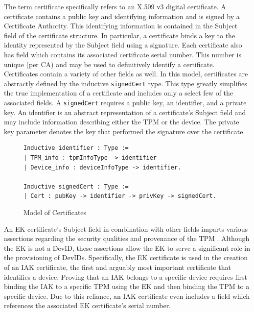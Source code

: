 The term certificate specifically refers to an X.509 v3 digital certificate. 
A certificate contains a public key and identifying information and is signed by a Certificate Authority. This identifying information is contained in the Subject field of the certificate structure. 
In particular, a certificate binds a key to the identity represented by the Subject field using a signature.
Each certificate also has field which contains its associated certificate serial number. This number is unique (per CA) and may be used to definitively identify a certificate. 
Certificates contain a variety of other fields as well.
In this model, certificates are abstractly defined by the inductive \verb|signedCert| type. This type greatly simplifies the true implementation of a certificate and includes only a select few of the associated fields. A \verb|signedCert| requires a public key, an identifier, and a private key. An identifier is an abstract representation of a certificate's Subject field and may include information describing either the TPM or the device. The private key parameter denotes the key that performed the signature over the certificate.
\begin{figure}[h]
\begin{lstlisting}[language=Coq]
Inductive identifier : Type :=
| TPM_info : tpmInfoType -> identifier
| Device_info : deviceInfoType -> identifier.

Inductive signedCert : Type :=
| Cert : pubKey -> identifier -> privKey -> signedCert.
\end{lstlisting}
\caption{Model of Certificates}
\end{figure}

An EK certificate's Subject field in combination with other fields imparts various assertions regarding the security qualities and provenance of the TPM \cite{EKSpec}. 
Although the EK is not a DevID, these assertions allow the EK to serve a significant role in the provisioning of DevIDs.
Specifically, the EK certificate is used in the creation of an IAK certificate, the first and arguably most important certificate that identifies a device.
Proving that an IAK belongs to a specific device requires first binding the IAK to a specific TPM using the EK and then binding the TPM to a specific device. Due to this reliance, an IAK certificate even includes a field which references the associated EK certificate's serial number.


